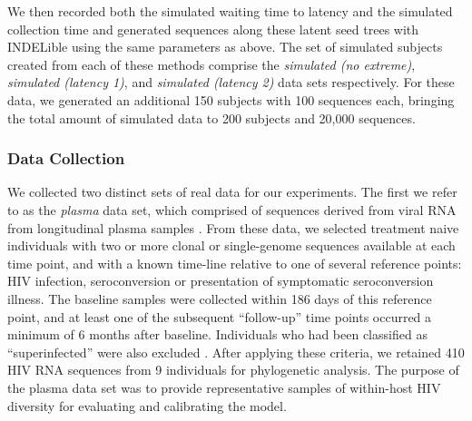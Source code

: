 \documentclass[12pt]{article}
\begin{document}

We then recorded both the simulated waiting time to latency and the simulated collection time and generated sequences along these latent seed trees with INDELible using the same parameters as above.
The set of simulated subjects created from each of these methods comprise the \emph{simulated (no extreme)}, \emph{simulated (latency 1)}, and \emph{simulated (latency 2)} data sets respectively.
For these data, we generated an additional 150 subjects with 100 sequences each, bringing the total amount of simulated data to 200 subjects and 20,000 sequences.

\subsubsection * {Data Collection} \label{subsec:dcollection} %
We collected two distinct sets of real data for our experiments. 
The first we refer to as the {\em plasma} data set, which comprised of sequences derived from viral RNA from longitudinal plasma samples \citep{McCloskey14}. 
From these data, we selected treatment naive individuals with two or more clonal or single-genome sequences available at each time point, and with a known time-line relative to one of several reference points: HIV infection, seroconversion or presentation of symptomatic seroconversion illness. 
The baseline samples were collected within 186 days of this reference point, and at least one of the subsequent ``follow-up'' time points occurred a minimum of 6 months after baseline.
Individuals who had been classified as ``superinfected'' were also excluded \citep{McCloskey14}.
After applying these criteria, we retained 410 HIV RNA sequences from 9 individuals for phylogenetic analysis.
The purpose of the plasma data set was to provide representative samples of within-host HIV diversity for evaluating and calibrating the model.
\end{document}
